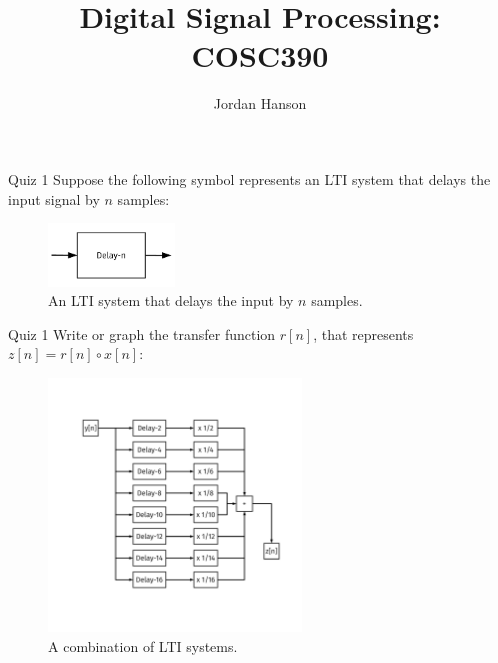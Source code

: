 \documentclass{beamer}
\title{Digital Signal Processing: COSC390}
\author{Jordan Hanson}
\institute{Whittier College Department of Physics and Astronomy}
\begin{document}
\maketitle

\begin{frame}{Quiz 1}
Suppose the following symbol represents an LTI system that delays the input signal by $n$ samples:
\begin{figure}
\centering
\includegraphics[width=0.3\textwidth]{delay-n.pdf}
\caption{\label{fig:n} An LTI system that delays the input by $n$ samples.}
\end{figure}
\end{frame}

\begin{frame}{Quiz 1}
\small
Write or graph the transfer function $r[n]$, that represents $z[n] = r[n] \circ x[n]$:
\begin{figure}
\centering
\includegraphics[width=0.6\textwidth,trim=2cm 4cm 2cm 4cm,clip=true]{delay-sum.pdf}
\caption{\label{fig:nsum} A combination of LTI systems.}
\end{figure}
\end{frame}
\end{document}

